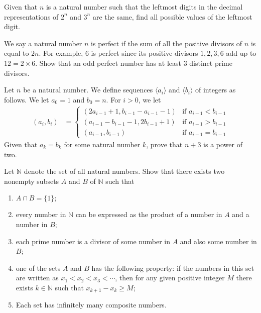 \documentclass[problems.tex]{subfile}
\begin{document}
	\begin{problem}
		Given that $n$ is a natural number such that the leftmost digits in the decimal representations of $2^n$ and $3^n$ are the same, find all possible values of the leftmost digit. %
	\end{problem}

	\begin{problem}
		We say a natural number $n$ is perfect if the sum of all the positive divisors of $n$ is equal to $2n$. For example, $6$ is perfect since its positive divisors $1,2,3,6$ add up to $12=2\times 6$. Show that an odd perfect number has at least $3$ distinct prime divisors. %
	\end{problem}

	\begin{problem}
		Let $n$ be a natural number. We define sequences $\langle a_i\rangle$ and $\langle b_i\rangle$ of integers as follows. We let $a_0=1$ and $b_0=n$. For $i>0$, we let
			\begin{align*}
				(a_i,b_i)
					& =
					\begin{cases}
						\left(2a_{i-1}+1,b_{i-1}-a_{i-1}-1\right) & \text{if } a_{i-1}<b_{i-1}\\
						\left( a_{i-1}-b_{i-1}-1,2b_{i-1}+1\right) & \text{if } a_{i-1}>b_{i-1}\\
						\left(a_{i-1},b_{i-1}\right) & \text{if } a_{i-1}=b_{i-1}
					\end{cases}
			\end{align*}
		Given that $a_k=b_k$ for some natural number $k$, prove that $n+3$ is a power of two. %
	\end{problem}

	\begin{problem}
		Let $\mathbb N$ denote the set of all natural numbers. Show that there exists two nonempty subsets $A$ and $B$ of $\mathbb N$ such that
		\begin{enumerate}
			\item $A\cap B=\{1\};$
			\item every number in $\mathbb N$ can be expressed as the product of a number in $A$ and a number in $B$;
			\item each prime number is a divisor of some number in $A$ and also some number in $B$;
			\item one of the sets $A$ and $B$ has the following property: if the numbers in this set are written as $x_1<x_2<x_3<\cdots$, then for any given positive integer $M$ there exists $k\in \mathbb N$ such that $x_{k+1}-x_k\ge M$;
			\item Each set has infinitely many composite numbers.
		\end{enumerate}
	\end{problem}
\end{document}

